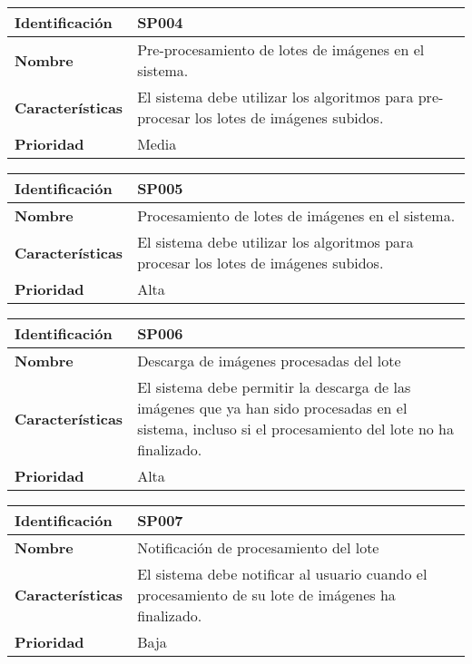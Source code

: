 \documentclass{scrreprt}
\begin{document}
\vspace{0.8cm}


\begin{tabular}{ |p{3cm}|p{10cm}|  }
  \hline
  \textbf{Identificación} & SP004  \\
  \hline
  \textbf{Nombre} & Pre-procesamiento de lotes de imágenes en el sistema. \\
  \hline
  \textbf{Características} & El sistema debe utilizar los algoritmos para pre-procesar los lotes de imágenes subidos.  \\
  \hline
  \textbf{Prioridad} & Media \\
  \hline
\end{tabular}

\vspace{0.8cm}

\begin{tabular}{ |p{3cm}|p{10cm}|  }
  \hline
  \textbf{Identificación} & SP005 \\
  \hline
  \textbf{Nombre} & Procesamiento de lotes de imágenes en el sistema. \\
  \hline
  \textbf{Características} & El sistema debe utilizar los algoritmos para procesar los lotes de imágenes subidos. \\
  \hline
  \textbf{Prioridad} & Alta \\
  \hline
\end{tabular}


\begin{tabular}{ |p{3cm}|p{10cm}|  }
  \hline
  \textbf{Identificación} & SP006  \\
  \hline
  \textbf{Nombre} & Descarga de imágenes procesadas del lote \\
  \hline
  \textbf{Características} & El sistema debe permitir la descarga de las imágenes que ya han sido procesadas en el sistema, incluso si el procesamiento del lote no ha finalizado. \\
  \hline
  \textbf{Prioridad} & Alta \\
  \hline
\end{tabular}

\vspace{0.8cm}

\begin{tabular}{ |p{3cm}|p{10cm}|  }
  \hline
  \textbf{Identificación} & SP007 \\
  \hline
  \textbf{Nombre} & Notificación de procesamiento del lote \\
  \hline
  \textbf{Características} & El sistema debe notificar al usuario cuando el procesamiento de su lote de imágenes ha finalizado. \\
  \hline
  \textbf{Prioridad} & Baja \\
  \hline
\end{tabular}
\end{document}
